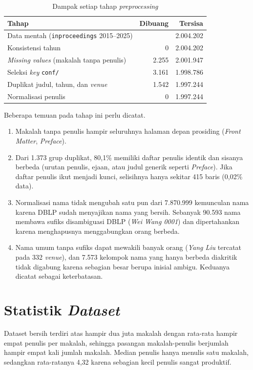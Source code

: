 \begin{table}[!htb]
\caption{Dampak setiap tahap \textit{preprocessing}}
\label{tab:dampak}
\small
\begin{tabular*}{\textwidth}{@{\extracolsep{\fill}}@{}lrr@{}}
\toprule
\textbf{Tahap} & \textbf{Dibuang} & \textbf{Tersisa} \\
\midrule
Data mentah (\texttt{inproceedings} 2015--2025) & & 2.004.202 \\
Konsistensi tahun & 0 & 2.004.202 \\
\textit{Missing values} (makalah tanpa penulis) & 2.255 & 2.001.947 \\
Seleksi \textit{key} \texttt{conf/} & 3.161 & 1.998.786 \\
Duplikat judul, tahun, dan \textit{venue} & 1.542 & 1.997.244 \\
Normalisasi penulis & 0 & 1.997.244 \\
\bottomrule
\end{tabular*}
\end{table}

Beberapa temuan pada tahap ini perlu dicatat.
\begin{enumerate}
\item Makalah tanpa penulis hampir seluruhnya halaman depan prosiding (\textit{Front Matter}, \textit{Preface}).
\item Dari 1.373 grup duplikat, 80,1\% memiliki daftar penulis identik dan sisanya berbeda (urutan penulis, ejaan, atau judul generik seperti \textit{Preface}). Jika daftar penulis ikut menjadi kunci, selisihnya hanya sekitar 415 baris (0,02\% data).
\item Normalisasi nama tidak mengubah satu pun dari 7.870.999 kemunculan nama karena DBLP sudah menyajikan nama yang bersih. Sebanyak 90.593 nama membawa sufiks disambiguasi DBLP (\textit{Wei Wang 0001}) dan dipertahankan karena menghapusnya menggabungkan orang berbeda.
\item Nama umum tanpa sufiks dapat mewakili banyak orang (\textit{Yang Liu} tercatat pada 332 \textit{venue}), dan 7.573 kelompok nama yang hanya berbeda diakritik tidak digabung karena sebagian besar berupa inisial ambigu. Keduanya dicatat sebagai keterbatasan.
\end{enumerate}

\section{Statistik \textit{Dataset}}
\label{sec:hasil-statistik}
Dataset bersih terdiri atas hampir dua juta makalah dengan rata-rata hampir empat penulis per makalah, sehingga pasangan makalah-penulis berjumlah hampir empat kali jumlah makalah. Median penulis hanya menulis satu makalah, sedangkan rata-ratanya 4,32 karena sebagian kecil penulis sangat produktif.

